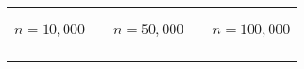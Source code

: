 \documentclass[12pt]{article}
\begin{document}
\begin{figure}[t]
\begin{footnotesize}
\begin{center}%
\hspace*{-0.5cm}%
\begin{tabular}
[c]{ccccc}%
\begin{normalsize}%
$n=10,000$%
\end{normalsize}%
&  &
\begin{normalsize}%
$n=50,000$%
\end{normalsize}%
&  &
\begin{normalsize}%
$n=100,000$%
\end{normalsize}%
\vspace{0.15cm}%
\\%
{\includegraphics[
height=1.7071in,
width=2.1283in
]%
{figs/theory_ER_N10000_dcT.png}%
}
&  &

\end{tabular}
\end{center}
\end{footnotesize}
\end{figure}
\end{document}
